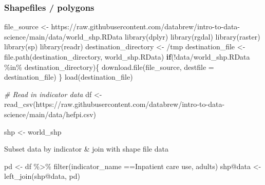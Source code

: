 \documentclass[
]{book}
\newenvironment{Shaded}{\begin{snugshade}}{\end{snugshade}}
\newcommand{\AttributeTok}[1]{\textcolor[rgb]{0.77,0.63,0.00}{#1}}
\newcommand{\CommentTok}[1]{\textcolor[rgb]{0.56,0.35,0.01}{\textit{#1}}}
\newcommand{\ControlFlowTok}[1]{\textcolor[rgb]{0.13,0.29,0.53}{\textbf{#1}}}
\newcommand{\FunctionTok}[1]{\textcolor[rgb]{0.00,0.00,0.00}{#1}}
\newcommand{\NormalTok}[1]{#1}
\newcommand{\OtherTok}[1]{\textcolor[rgb]{0.56,0.35,0.01}{#1}}
\newcommand{\SpecialCharTok}[1]{\textcolor[rgb]{0.00,0.00,0.00}{#1}}
\newcommand{\StringTok}[1]{\textcolor[rgb]{0.31,0.60,0.02}{#1}}
\begin{document}
\hypertarget{shapefiles-polygons}{%
\subsubsection*{Shapefiles / polygons}\label{shapefiles-polygons}}

\begin{Shaded}
\begin{Highlighting}[]
\NormalTok{file\_source }\OtherTok{\textless{}{-}} \StringTok{\textquotesingle{}https://raw.githubusercontent.com/databrew/intro{-}to{-}data{-}science/main/data/world\_shp.RData\textquotesingle{}}
\FunctionTok{library}\NormalTok{(dplyr)}
\FunctionTok{library}\NormalTok{(rgdal)}
\FunctionTok{library}\NormalTok{(raster)}
\FunctionTok{library}\NormalTok{(sp)}
\FunctionTok{library}\NormalTok{(readr)}
\NormalTok{destination\_directory }\OtherTok{\textless{}{-}} \StringTok{\textquotesingle{}/tmp\textquotesingle{}}
\NormalTok{destination\_file }\OtherTok{\textless{}{-}} \FunctionTok{file.path}\NormalTok{(destination\_directory, }\StringTok{\textquotesingle{}world\_shp.RData\textquotesingle{}}\NormalTok{)}
\ControlFlowTok{if}\NormalTok{(}\SpecialCharTok{!}\StringTok{\textquotesingle{}data/world\_shp.RData\textquotesingle{}} \SpecialCharTok{\%in\%}\NormalTok{ destination\_directory)\{}
  \FunctionTok{download.file}\NormalTok{(file\_source,}
                \AttributeTok{destfile =}\NormalTok{ destination\_file)}
\NormalTok{\}}
\FunctionTok{load}\NormalTok{(destination\_file)}

\CommentTok{\# Read in indicator data}
\NormalTok{df }\OtherTok{\textless{}{-}} \FunctionTok{read\_csv}\NormalTok{(}\StringTok{\textquotesingle{}https://raw.githubusercontent.com/databrew/intro{-}to{-}data{-}science/main/data/hefpi.csv\textquotesingle{}}\NormalTok{)}

\NormalTok{shp }\OtherTok{\textless{}{-}}\NormalTok{ world\_shp}
\end{Highlighting}
\end{Shaded}

Subset data by indicator \& join with shape file data

\begin{Shaded}
\begin{Highlighting}[]
\NormalTok{pd }\OtherTok{\textless{}{-}}\NormalTok{ df }\SpecialCharTok{\%\textgreater{}\%} \FunctionTok{filter}\NormalTok{(indicator\_name }\SpecialCharTok{==}\StringTok{\textquotesingle{}Inpatient care use, adults\textquotesingle{}}\NormalTok{)}
\NormalTok{shp}\SpecialCharTok{@}\NormalTok{data }\OtherTok{\textless{}{-}} \FunctionTok{left\_join}\NormalTok{(shp}\SpecialCharTok{@}\NormalTok{data, pd)}
\end{Highlighting}
\end{Shaded}
\end{document}
